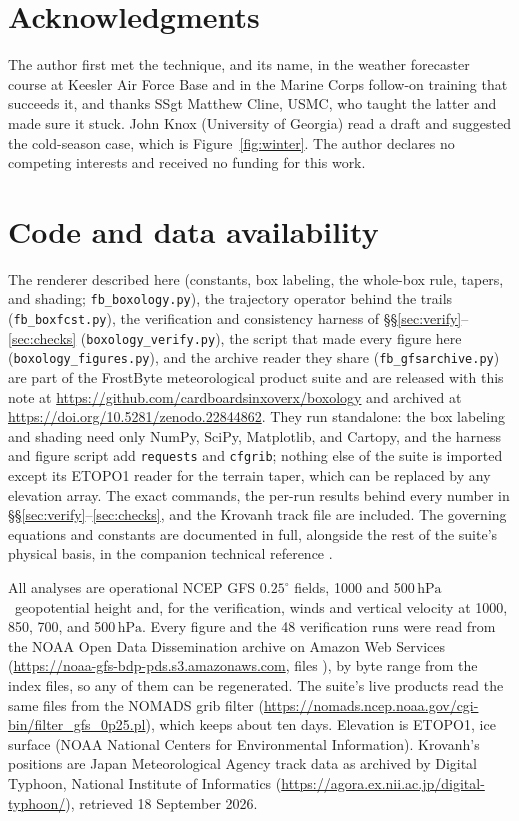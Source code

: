 \documentclass[11pt]{article}
\newcommand{\hPa}{\ensuremath{\,\mathrm{hPa}}}
\begin{document}
\section*{Acknowledgments}

The author first met the technique, and its name, in the weather forecaster course at Keesler Air Force Base and in the Marine Corps follow-on training that succeeds it, and thanks SSgt Matthew Cline, USMC, who taught the latter and made sure it stuck. John Knox (University of Georgia) read a draft and suggested the cold-season case, which is Figure~\ref{fig:winter}. The author declares no competing interests and received no funding for this work.

\section*{Code and data availability}

The renderer described here (constants, box labeling, the whole-box rule, tapers, and shading; \texttt{fb\_boxology.py}), the trajectory operator behind the trails (\texttt{fb\_boxfcst.py}), the verification and consistency harness of \S\S\ref{sec:verify}--\ref{sec:checks} (\texttt{boxology\_verify.py}), the script that made every figure here (\texttt{boxology\_figures.py}), and the archive reader they share (\texttt{fb\_gfsarchive.py}) are part of the FrostByte meteorological product suite and are released with this note at \url{https://github.com/cardboardsinxoverx/boxology} and archived at \url{https://doi.org/10.5281/zenodo.22844862}. They run standalone: the box labeling and shading need only NumPy, SciPy, Matplotlib, and Cartopy, and the harness and figure script add \texttt{requests} and \texttt{cfgrib}; nothing else of the suite is imported except its ETOPO1 reader for the terrain taper, which can be replaced by any elevation array. The exact commands, the per-run results behind every number in \S\S\ref{sec:verify}--\ref{sec:checks}, and the Krovanh track file are included. The governing equations and constants are documented in full, alongside the rest of the suite's physical basis, in the companion technical reference \citep{lane2026}.

All analyses are operational NCEP GFS $0.25^\circ$ fields, 1000 and 500\hPa\ geopotential height and, for the verification, winds and vertical velocity at 1000, 850, 700, and 500\hPa. Every figure and the 48 verification runs were read from the NOAA Open Data Dissemination archive on Amazon Web Services (\url{https://noaa-gfs-bdp-pds.s3.amazonaws.com}, files ), by byte range from the index files, so any of them can be regenerated. The suite's live products read the same files from the NOMADS grib filter (\url{https://nomads.ncep.noaa.gov/cgi-bin/filter_gfs_0p25.pl}), which keeps about ten days. Elevation is ETOPO1, ice surface (NOAA National Centers for Environmental Information). Krovanh's positions are Japan Meteorological Agency track data as archived by Digital Typhoon, National Institute of Informatics (\url{https://agora.ex.nii.ac.jp/digital-typhoon/}), retrieved 18 September 2026.
\end{document}
